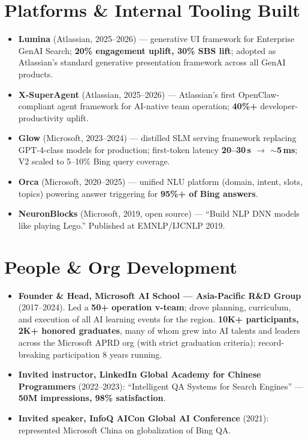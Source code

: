 \documentclass[10.5pt,letterpaper]{article}
\begin{document}
\section*{Platforms \& Internal Tooling Built}
\begin{itemize}
  \item \textbf{Lumina} (Atlassian, 2025--2026) --- generative UI framework for Enterprise GenAI Search; \textbf{20\% engagement uplift, 30\% SBS lift}; adopted as Atlassian's standard generative presentation framework across all GenAI products.
  \item \textbf{X-SuperAgent} (Atlassian, 2025--2026) --- Atlassian's first OpenClaw-compliant agent framework for AI-native team operation; \textbf{40\%+} developer-productivity uplift.
  \item \textbf{Glow} (Microsoft, 2023--2024) --- distilled SLM serving framework replacing GPT-4-class models for production; first-token latency \textbf{20--30\,s $\to$ $\sim$5\,ms}; V2 scaled to 5--10\% Bing query coverage.
  \item \textbf{Orca} (Microsoft, 2020--2025) --- unified NLU platform (domain, intent, slots, topics) powering answer triggering for \textbf{95\%+ of Bing answers}.
  \item \textbf{NeuronBlocks} (Microsoft, 2019, open source) --- ``Build NLP DNN models like playing Lego.'' Published at EMNLP/IJCNLP 2019.
\end{itemize}

\section*{People \& Org Development}
\begin{itemize}
  \item \textbf{Founder \& Head, Microsoft AI School --- Asia-Pacific R\&D Group} (2017--2024). Led a \textbf{50+ operation v-team}; drove planning, curriculum, and execution of all AI learning events for the region. \textbf{10K+ participants, 2K+ honored graduates}, many of whom grew into AI talents and leaders across the Microsoft APRD org (with strict graduation criteria); record-breaking participation 8 years running.
  \item \textbf{Invited instructor, LinkedIn Global Academy for Chinese Programmers} (2022--2023): ``Intelligent QA Systems for Search Engines'' — \textbf{50M impressions, 98\% satisfaction}.
  \item \textbf{Invited speaker, InfoQ AICon Global AI Conference} (2021): represented Microsoft China on globalization of Bing QA.
\end{itemize}
\end{document}
